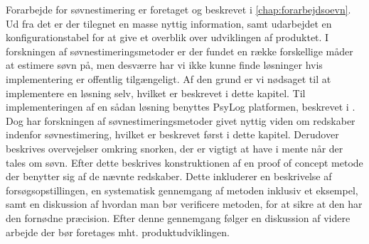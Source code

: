 Forarbejde for søvnestimering er foretaget og beskrevet i \cref{chap:forarbejdsoevn}.
Ud fra det er der tilegnet en masse nyttig information, samt udarbejdet en konfigurationstabel for at give et overblik over udviklingen af produktet.
I forskningen af søvn\-estimerings\-metoder er der fundet en række forskellige måder at estimere søvn på, men desværre har vi ikke kunne finde løsninger hvis implementering er offentlig tilgængeligt.
Af den grund er vi nødsaget til at implementere en løsning selv, hvilket er beskrevet i dette kapitel.
Til implementeringen af en sådan løsning benyttes PsyLog platformen, beskrevet i \citet{misc:faellesrapp}.
Dog har forskningen af søvnestimeringsmetoder givet nyttig viden om redskaber indenfor søvnestimering, hvilket er beskrevet først i dette kapitel.
Derudover beskrives overvejelser omkring snorken, der er vigtigt at have i mente når der tales om søvn.
Efter dette beskrives konstruktionen af en proof of concept metode der benytter sig af de nævnte redskaber.
Dette inkluderer en beskrivelse af forsøgsopstillingen, en systematisk gennemgang af metoden inklusiv et eksempel, samt en diskussion af hvordan man bør verificere metoden, for at sikre at den har den fornødne præcision.
Efter denne gennemgang følger en diskussion af videre arbejde der bør foretages mht. produktudviklingen.







